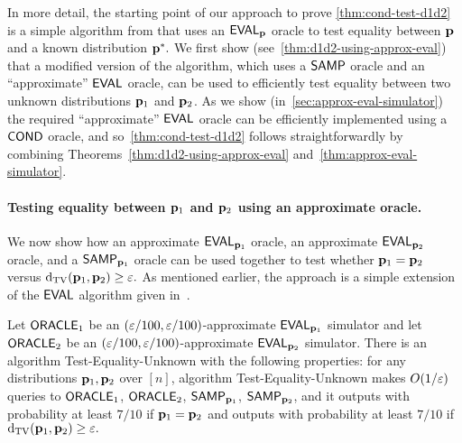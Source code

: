 In more detail, the starting point of our approach to prove
\cref{thm:cond-test-d1d2} is a simple algorithm from
\cite{RS:09} that uses an ${\sf EVAL}_{\mathbf{p}}$
oracle to test equality between $\mathbf{p}$ and a known distribution $\mathbf{p}^\ast.$
We first show
(see~\cref{thm:d1d2-using-approx-eval})
that a modified version of the algorithm, which uses
a ${\sf SAMP}$ oracle and an ``approximate'' ${\sf EVAL}$ oracle,
can be used to efficiently test equality between two unknown
distributions $\mathbf{p}_1$ and $\mathbf{p}_2$.  As we show (in~\cref{sec:approx-eval-simulator}) the required ``approximate'' ${\sf EVAL}$ oracle can be efficiently implemented using
a ${\sf COND}$ oracle, and so~\cref{thm:cond-test-d1d2} follows straightforwardly by combining Theorems~\ref{thm:d1d2-using-approx-eval} and~\ref{thm:approx-eval-simulator}.


\paragraph{Testing equality between \texorpdfstring{$\mathbf{p}_1$ and $\mathbf{p}_2$}{ and } using an approximate \EVAL oracle.}
\label{sec:test-d1d2-approx-eval}

We now show how an approximate ${\sf EVAL}_{\mathbf{p}_1}$
oracle, an approximate ${\sf EVAL}_{\mathbf{p}_2}$ oracle, and a ${\sf SAMP}_{\mathbf{p}_1}$
oracle can be used together to test whether
$\mathbf{p}_1 = \mathbf{p}_2$ versus $\operatorname{d}_{\rm{TV}}(\mathbf{p}_1,\mathbf{p}_2) \geq \varepsilon.$
As mentioned earlier, the approach is a simple extension of the ${\sf EVAL}$
algorithm
given in~\cite[Observation~24]{RS:09}.

\begin{theorem} \label{thm:d1d2-using-approx-eval}
Let ${\sf ORACLE}_1$ be an $(\varepsilon/100,\varepsilon/100)$-approximate ${\sf EVAL}_{\mathbf{p}_1}$
simulator and let ${\sf ORACLE}_2$ be an $(\varepsilon/100,\varepsilon/100)$-approximate
${\sf EVAL}_{\mathbf{p}_2}$ simulator.  There is an algorithm
{\sc Test-Equality-Unknown} with the following properties:  for
any distributions $\mathbf{p}_1,\mathbf{p}_2$ over $[n]$, algorithm
{\sc Test-Equality-Unknown} makes $O(1/\varepsilon)$ queries to
${\sf ORACLE}_1$, ${\sf ORACLE}_2$, ${\sf SAMP}_{\mathbf{p}_1}$, ${\sf SAMP}_{\mathbf{p}_2}$, and it outputs
\accept with probability at least $7/10$ if $\mathbf{p}_1 = \mathbf{p}_2$ and outputs
\reject with probability at least $7/10$ if $\operatorname{d}_{\rm{TV}}(\mathbf{p}_1,\mathbf{p}_2) \geq \varepsilon.$
\end{theorem}



